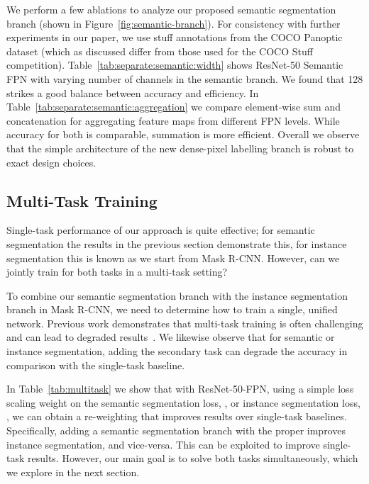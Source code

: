 \documentclass[10pt,twocolumn,letterpaper]{article}
\makeatletter
\renewcommand\paragraph{\@startsection{paragraph}{4}{\z@}{.5em \@plus1ex \@minus.1ex}{-.5em}{\normalfont\normalsize\bfseries}}
\makeatother
\begin{document}
{\paragraph{Ablations:} We perform a few ablations to analyze our proposed semantic segmentation branch (shown in Figure~\ref{fig:semantic-branch}). For consistency with further experiments in our paper, we use stuff annotations from the COCO Panoptic dataset (which as discussed differ from those used for the COCO Stuff competition). Table~\ref{tab:separate:semantic:width} shows ResNet-50 Semantic FPN with varying number of channels in the semantic branch. We found that 128 strikes a good balance between accuracy and efficiency. In Table~\ref{tab:separate:semantic:aggregation} we compare element-wise sum and concatenation for aggregating feature maps from different FPN levels. While accuracy for both is comparable, summation is more efficient. Overall we observe that the simple architecture of the new dense-pixel labelling branch is robust to exact design choices.

\subsection{Multi-Task Training}

Single-task performance of our approach is quite effective; for semantic segmentation the results in the previous section demonstrate this, for instance segmentation this is known as we start from Mask R-CNN. However, can we jointly train for both tasks in a multi-task setting?

To combine our semantic segmentation branch with the instance segmentation branch in Mask R-CNN, we need to determine how to train a single, unified network. Previous work demonstrates that multi-task training is often challenging and can lead to degraded results~\cite{kokkinos2016ubernet, kendall2017multi}. We likewise observe that for semantic or instance segmentation, adding the secondary task can degrade the accuracy in comparison with the single-task baseline.

In Table~\ref{tab:multitask} we show that with ResNet-50-FPN, using a simple loss scaling weight on the semantic segmentation loss, , or instance segmentation loss, , we can obtain a re-weighting that improves results over single-task baselines. Specifically, adding a semantic segmentation branch with the proper  improves instance segmentation, and vice-versa. This can be exploited to improve single-task results. However, our main goal is to solve both tasks simultaneously, which we explore in the next section.

}
\end{document}
